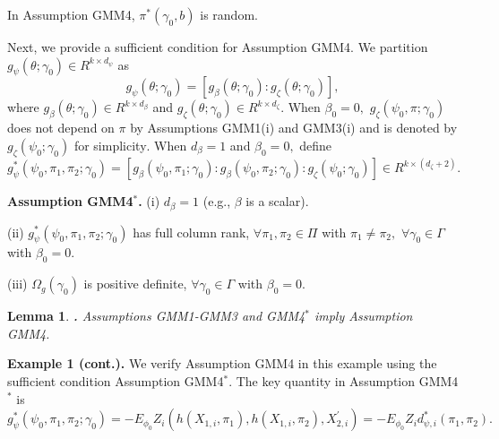 \documentclass[12pt,titlepage,final,oneside,letterpaper]{article}
\newtheorem{lemma}{Lemma}[section]
\begin{document}
In Assumption GMM4, $\pi ^{\ast }(\gamma _{0},b)$ is random.

Next, we provide a sufficient condition for Assumption GMM4. We partition $%
g_{\psi }(\theta ;\gamma _{0})\allowbreak \in R^{k\times d_{\psi }}$ as%
\begin{equation}
g_{\psi }(\theta ;\gamma _{0})=[g_{\beta }(\theta ;\gamma _{0}):g_{\zeta
}(\theta ;\gamma _{0})],
\end{equation}%
where $g_{\beta }(\theta ;\gamma _{0})\in R^{k\times d_{\beta }}$ and $%
g_{\zeta }(\theta ;\gamma _{0})\in R^{k\times d_{\zeta }}.$ When $\beta
_{0}=0,$ $g_{\zeta }(\psi _{0},\pi ;\gamma _{0})$ does not depend on $\pi $
by Assumptions GMM1(i) and GMM3(i) and is denoted by $g_{\zeta }(\psi
_{0};\gamma _{0})$ for simplicity$.$ When $d_{\beta }=1$ and $\beta _{0}=0,$
define 
\begin{equation}
g_{\psi }^{\ast }(\psi _{0},\pi _{1},\pi _{2};\gamma _{0})=[g_{\beta }(\psi
_{0},\pi _{1};\gamma _{0}):g_{\beta }(\psi _{0},\pi _{2};\gamma
_{0}):g_{\zeta }(\psi _{0};\gamma _{0})]\in R^{k\times (d_{\zeta }+2)}.
\end{equation}

\noindent \textbf{Assumption GMM4}$^{\ast }$\textbf{.} (i) $d_{\beta }=1$
(e.g., $\beta $ is a scalar).

\noindent (ii) $g_{\psi }^{\ast }(\psi _{0},\pi _{1},\pi _{2};\gamma _{0})$
has full column rank, $\forall \pi _{1},\pi _{2}\in \Pi $ with $\pi _{1}\neq
\pi _{2},$ $\forall \gamma _{0}\in \Gamma $ with $\beta _{0}=0.$

\noindent (iii) $\Omega _{g}(\gamma _{0})$ is positive definite, $\forall
\gamma _{0}\in \Gamma $ with $\beta _{0}=0.$\medskip

\begin{lemma}
\hspace{-0.08in}\textbf{.} \label{Lemma As GMM4}Assumptions \emph{GMM1-GMM3 }%
and \emph{GMM4}$^{\ast }$ imply Assumption \emph{GMM4.}
\end{lemma}

\noindent \textbf{Example 1 (cont.). }We verify Assumption GMM4 in this
example using the sufficient condition Assumption GMM4$^{\ast }.$ The key
quantity in Assumption GMM4$^{\ast }$ is 
\begin{equation}
g_{\psi }^{\ast }(\psi _{0},\pi _{1},\pi _{2};\gamma _{0})=-E_{\phi
_{0}}Z_{i}(h(X_{1,i},\pi _{1}),h(X_{1,i},\pi _{2}),X_{2,i}^{\prime
})=-E_{\phi _{0}}Z_{i}d_{\psi ,i}^{\ast }(\pi _{1},\pi _{2}).
\end{equation}
\end{document}
